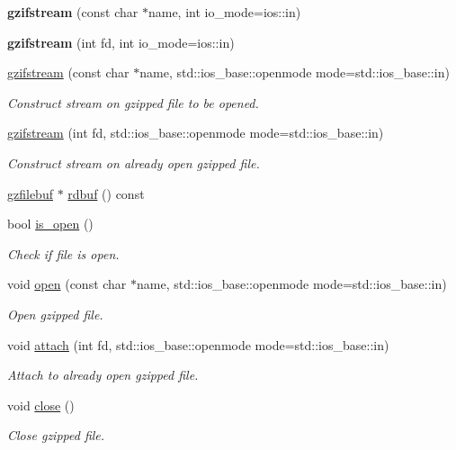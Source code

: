 \begin{DoxyCompactItemize}
\item 
\hypertarget{classgzifstream_a56e464903ee517fb3377f9d8a2977694}{{\bfseries gzifstream} (const char $\ast$name, int io\+\_\+mode=ios\+::in)}\label{classgzifstream_a56e464903ee517fb3377f9d8a2977694}

\item 
\hypertarget{classgzifstream_ab1380a28c963c7b3b85dc63d0d11cc1a}{{\bfseries gzifstream} (int fd, int io\+\_\+mode=ios\+::in)}\label{classgzifstream_ab1380a28c963c7b3b85dc63d0d11cc1a}

\item 
\hyperlink{classgzifstream_a90f6e0eea83b7ce3c64f755b51b5b011}{gzifstream} (const char $\ast$name, std\+::ios\+\_\+base\+::openmode mode=std\+::ios\+\_\+base\+::in)
\begin{DoxyCompactList}\small\item\em Construct stream on gzipped file to be opened. \end{DoxyCompactList}\item 
\hyperlink{classgzifstream_aa5ab9dcc3ab35bffe781f4c49239826e}{gzifstream} (int fd, std\+::ios\+\_\+base\+::openmode mode=std\+::ios\+\_\+base\+::in)
\begin{DoxyCompactList}\small\item\em Construct stream on already open gzipped file. \end{DoxyCompactList}\item 
\hyperlink{classgzfilebuf}{gzfilebuf} $\ast$ \hyperlink{classgzifstream_a9e5750d2c643025b2bd8725871585860}{rdbuf} () const 
\item 
bool \hyperlink{classgzifstream_a8e9de13b311b698ef0ccc276b71c7941}{is\+\_\+open} ()
\begin{DoxyCompactList}\small\item\em Check if file is open. \end{DoxyCompactList}\item 
void \hyperlink{classgzifstream_a8105f9300d36dafbe8b10c204583f5a1}{open} (const char $\ast$name, std\+::ios\+\_\+base\+::openmode mode=std\+::ios\+\_\+base\+::in)
\begin{DoxyCompactList}\small\item\em Open gzipped file. \end{DoxyCompactList}\item 
void \hyperlink{classgzifstream_a24aff901c395acbdaddb7878f4ddb7aa}{attach} (int fd, std\+::ios\+\_\+base\+::openmode mode=std\+::ios\+\_\+base\+::in)
\begin{DoxyCompactList}\small\item\em Attach to already open gzipped file. \end{DoxyCompactList}\item 
void \hyperlink{classgzifstream_a073fadd9dc90195c47a6ae2d863c8ace}{close} ()
\begin{DoxyCompactList}\small\item\em Close gzipped file. \end{DoxyCompactList}\end{DoxyCompactItemize}



